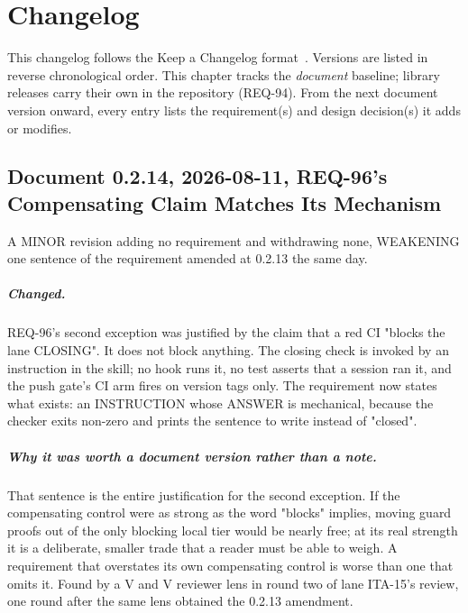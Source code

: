 
\chapter{Changelog}
\label{ch:changelog}

This changelog follows the Keep a Changelog format~\citep{keepachangelog}.
Versions are listed in reverse chronological order. This chapter tracks the
\emph{document} baseline; library releases carry their own
 in the repository (REQ-94). From the next document
version onward, every entry lists the requirement(s) and design decision(s)
it adds or modifies.

\section*{Document 0.2.14, 2026-08-11, REQ-96's Compensating Claim Matches Its Mechanism}

A MINOR revision adding no requirement and withdrawing none, WEAKENING one
sentence of the requirement amended at 0.2.13 the same day.

\paragraph{Changed.} REQ-96's second exception was justified by the claim
that a red CI "blocks the lane CLOSING". It does not block anything. The
closing check is invoked by an instruction in the  skill; no
hook runs it, no test asserts that a session ran it, and the push gate's CI
arm fires on version tags only. The requirement now states what exists: an
INSTRUCTION whose ANSWER is mechanical, because the checker exits non-zero
and prints the sentence to write instead of "closed".

\paragraph{Why it was worth a document version rather than a note.} That
sentence is the entire justification for the second exception. If the
compensating control were as strong as the word "blocks" implies, moving
guard proofs out of the only blocking local tier would be nearly free; at
its real strength it is a deliberate, smaller trade that a reader must be
able to weigh. A requirement that overstates its own compensating control
is worse than one that omits it. Found by a V and V reviewer lens in round
two of lane ITA-15's review, one round after the same lens obtained the
0.2.13 amendment.

